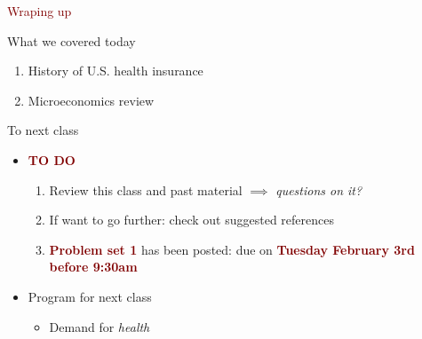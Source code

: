 \documentclass[12pt,notes=hide,aspectratio=169,mathserif]{beamer}
\newcommand\newbold[1]{\textcolor{maroon}{\textbf{#1}}}
\begin{document}


\begin{frame}{}
  \begin{center}
  \Large \textcolor{maroon}{Wraping up}
  \end{center}

\end{frame}
\begin{frame}{What we covered today}

  \begin{enumerate}
    \item History of U.S. health insurance
    \item Microeconomics review
  \end{enumerate}
\end{frame}
\begin{frame}{To next class}
  \begin{itemize}
      \item \newbold{TO DO}
      \begin{enumerate}
          \item Review this class and past material $\implies$ \textit{questions on it?}
          \item If want to go further: check out suggested references
          \item \newbold{Problem set 1} has been posted: due on \newbold{Tuesday February 3rd before 9:30am}
      \end{enumerate}
      \vspace{3mm}

      \item Program for next class
      \begin{itemize}
          \item Demand for \textit{health}
      \end{itemize}
  \end{itemize}
\end{frame}

%

%
\end{document}
